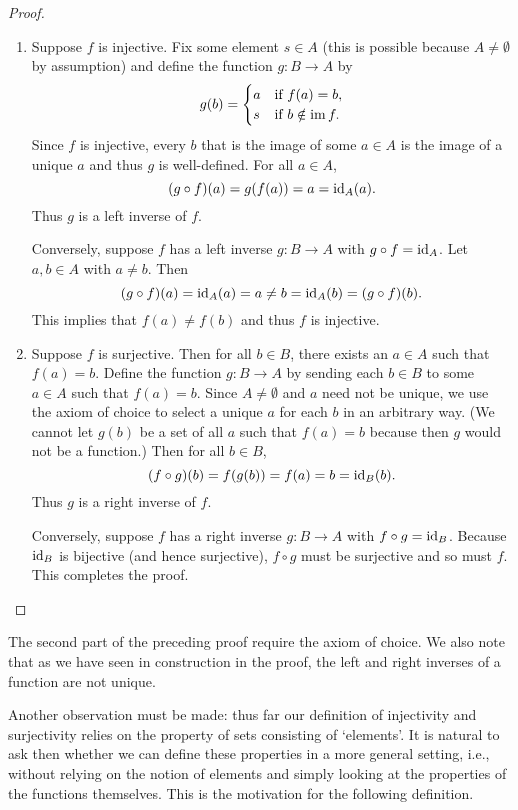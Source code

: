 \begin{proof}\(\)

    \begin{enumerate}[label=(\alph*), wide]
        \item Suppose \(f\) is injective. Fix some element \(s \in A\) (this is
        possible because \(A \neq \emptyset\) by assumption) and define the
        function \(g : B \to A\) by
        \[
            g(b) = \begin{cases}
                a & \text{if } f(a) = b, \\
                s & \text{if } b \notin \operatorname{im} f.
            \end{cases}
        \]
        Since \(f\) is injective, every \(b\) that is the image of some \(a \in
        A\) is the image of a unique \(a\) and thus \(g\) is well-defined. For
        all \(a \in A\),
        \[
            (g \circ f)(a) = g(f(a)) = a = \operatorname{id}_A(a).
        \]
        Thus \(g\) is a left inverse of \(f\).

        Conversely, suppose \(f\) has a left inverse \(g : B \to A\) with \(g
        \circ f = \operatorname{id}_A\). Let \(a, b \in A\) with \(a \neq b\). Then
        \[
            (g \circ f)(a) = \operatorname{id}_A(a) = a \neq b = \operatorname{id}_A(b) = (g \circ f)(b).
        \]
        This implies that \(f(a) \neq f(b)\) and thus \(f\) is injective.

        \item Suppose \(f\) is surjective. Then for all \(b \in B\), there
        exists an \(a \in A\) such that \(f(a) = b\). Define the function \(g :
        B \to A\) by sending each \(b \in B\) to some \(a \in A\) such that
        \(f(a) = b\). Since \(A \neq \emptyset\) and \(a\) need not be unique, we use the axiom of choice
        to select a unique \(a\) for each \(b\) in an arbitrary way. (We cannot
        let \(g(b)\) be a set of all \(a\) such that \(f(a) = b\) because then
        \(g\) would not be a function.) Then for all \(b \in B\),
        \[
            (f \circ g)(b) = f(g(b)) = f(a) = b = \operatorname{id}_B(b).
        \]
        Thus \(g\) is a right inverse of \(f\).

        Conversely, suppose \(f\) has a right inverse \(g : B \to A\) with \(f
        \circ g = \operatorname{id}_B\). Because \(\operatorname{id}_B\) is bijective (and hence
        surjective), \(f \circ g\) must be surjective and so must \(f\). This
        completes the proof.
    \end{enumerate}
\end{proof}

\begin{remark}
    The second part of the preceding proof require the axiom of choice. We also
    note that as we have seen in construction in the proof, the left and right
    inverses of a function are not unique.

    Another observation must be made: thus far our definition of injectivity and surjectivity relies on the property of sets consisting of `elements'. It is natural to ask then whether we can define these properties in a more general setting, i.e., without relying on the notion of elements and simply looking at the properties of the functions themselves. This is the motivation for the following definition.
\end{remark}

